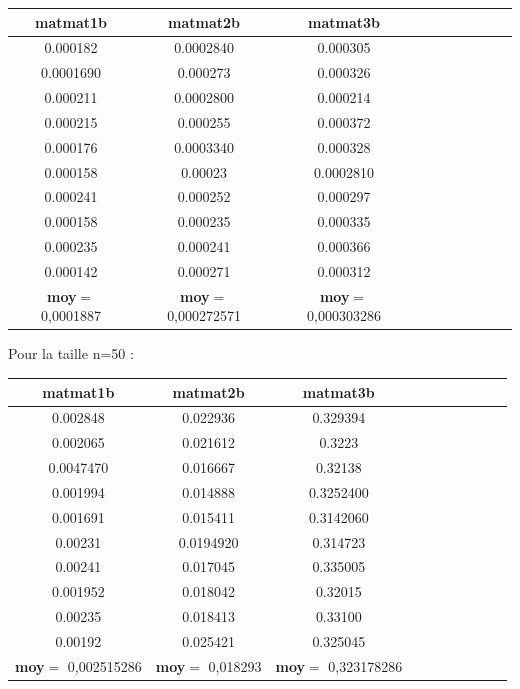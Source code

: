 \documentclass[12pt]{report}
\begin{document}
\begin{tabular}{|*{10}{c|}}
	\hline
	\textbf{matmat1b}  & \textbf{matmat2b}  & \textbf{matmat3b}\\
	\hline
	0.000182  & 0.0002840  & 0.000305   \\
	\hline
	0.0001690  & 0.000273  & 0.000326   \\
	\hline
	0.000211  & 0.0002800  & 0.000214   \\
	\hline
	0.000215  & 0.000255  & 0.000372   \\
	\hline
	0.000176  & 0.0003340  & 0.000328  \\
	\hline
	0.000158  & 0.00023  & 0.0002810   \\
	\hline
	0.000241  & 0.000252  & 0.000297   \\
	\hline
	0.000158  & 0.000235  & 0.000335   \\
	\hline
	0.000235  & 0.000241  & 0.000366   \\
	\hline
	0.000142  & 0.000271  & 0.000312   \\
	\hline
	\textbf{moy}$=$ 0,0001887  & \textbf{moy}$=$ 0,000272571  & \textbf{moy}$=$ 0,000303286   \\
	\hline
\end{tabular}

Pour la taille n=50 :\\


\begin{tabular}{|*{10}{c|}}
	\hline
	\textbf{matmat1b}  & \textbf{matmat2b}  & \textbf{matmat3b}\\
	\hline
	0.002848  & 0.022936  & 0.329394   \\
	\hline
	0.002065  & 0.021612  & 0.3223   \\
	\hline
	0.0047470  & 0.016667  & 0.32138   \\
	\hline
	0.001994  & 0.014888  & 0.3252400   \\
	\hline
	0.001691  & 0.015411  & 0.3142060  \\
	\hline
	0.00231  & 0.0194920  & 0.314723   \\
	\hline
	0.00241  & 0.017045  & 0.335005   \\
	\hline
	0.001952  & 0.018042  & 0.32015   \\
	\hline
	0.00235  & 0.018413  & 0.33100   \\
	\hline
	0.00192  & 0.025421  & 0.325045   \\
	\hline
	\textbf{moy}$=$ 0,002515286  & \textbf{moy}$=$ 0,018293  & \textbf{moy}$=$ 0,323178286   \\
	\hline
\end{tabular}\\
\end{document}
